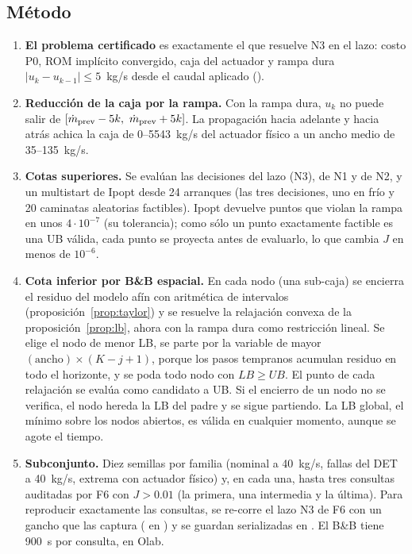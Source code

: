 \subsection{Método}
\begin{enumerate}
  \item \textbf{El problema certificado} es exactamente el que resuelve N3 en el lazo: costo P0,
        ROM implícito convergido, caja del actuador y rampa dura $|u_k-u_{k-1}|\le5$~kg/s desde el
        caudal aplicado ().
  \item \textbf{Reducción de la caja por la rampa.} Con la rampa dura, $u_k$ no puede salir de
        $[\dot m_{\rm prev}-5k,\ \dot m_{\rm prev}+5k]$. La propagación hacia adelante y hacia atrás
        achica la caja de 0--5543~kg/s del actuador físico a un ancho medio de 35--135~kg/s.
  \item \textbf{Cotas superiores.} Se evalúan las decisiones del lazo (N3), de N1 y de N2, y un
        multistart de Ipopt desde 24 arranques (las tres decisiones, uno en frío y 20 caminatas
        aleatorias factibles). Ipopt devuelve puntos que violan la rampa en unos $4\cdot10^{-7}$
        (su tolerancia); como sólo un punto exactamente factible es una UB válida, cada punto se
        proyecta antes de evaluarlo, lo que cambia $J$ en menos de $10^{-6}$.
  \item \textbf{Cota inferior por B\&B espacial.} En cada nodo (una sub-caja) se encierra el
        residuo del modelo afín con aritmética de intervalos (proposición~\ref{prop:taylor}) y se
        resuelve la relajación convexa de la proposición~\ref{prop:lb}, ahora con la rampa dura
        como restricción lineal. Se elige el nodo de menor LB, se parte por la variable de mayor
        $(\mathrm{ancho})\times(K-j+1)$, porque los pasos tempranos acumulan residuo en todo el
        horizonte, y se poda todo nodo con $LB\ge UB$. El punto de cada relajación se evalúa como
        candidato a UB. Si el encierro de un nodo no se verifica, el nodo hereda la LB del padre
        y se sigue partiendo. La LB global, el mínimo sobre los nodos abiertos, es válida en
        cualquier momento, aunque se agote el tiempo.
  \item \textbf{Subconjunto.} Diez semillas por familia (nominal a 40~kg/s, fallas del DET a
        40~kg/s, extrema con actuador físico) y, en cada una, hasta tres consultas auditadas
        por F6 con $J>0.01$ (la primera, una intermedia y la última). Para reproducir
        exactamente las consultas, se re-corre el lazo N3 de F6 con un gancho que las captura
        ( en ) y se guardan serializadas en
        . El B\&B tiene 900~s por consulta, en Olab.
\end{enumerate}

